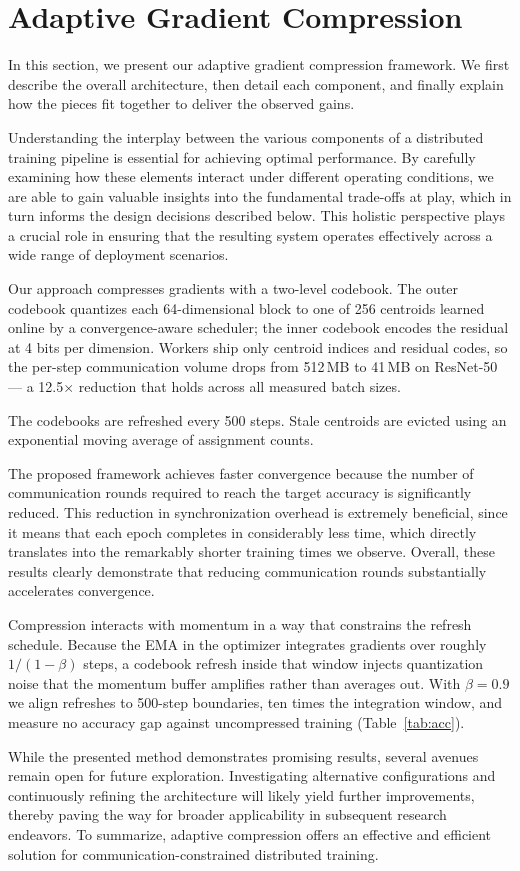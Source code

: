 \section{Adaptive Gradient Compression}\label{sec:method}

In this section, we present our adaptive gradient compression framework. We
first describe the overall architecture, then detail each component, and
finally explain how the pieces fit together to deliver the observed gains.

Understanding the interplay between the various components of a distributed
training pipeline is essential for achieving optimal performance. By carefully
examining how these elements interact under different operating conditions, we
are able to gain valuable insights into the fundamental trade-offs at play,
which in turn informs the design decisions described below. This holistic
perspective plays a crucial role in ensuring that the resulting system operates
effectively across a wide range of deployment scenarios.

Our approach compresses gradients with a two-level codebook. The outer codebook
quantizes each 64-dimensional block to one of 256 centroids learned online by a
convergence-aware scheduler; the inner codebook encodes the residual at 4 bits
per dimension. Workers ship only centroid indices and residual codes, so the
per-step communication volume drops from 512\,MB to 41\,MB on ResNet-50 ---
a 12.5$\times$ reduction that holds across all measured batch sizes.

The codebooks are refreshed every 500 steps. Stale centroids are evicted using
an exponential moving average of assignment counts.

The proposed framework achieves faster convergence because the number of
communication rounds required to reach the target accuracy is significantly
reduced. This reduction in synchronization overhead is extremely beneficial,
since it means that each epoch completes in considerably less time, which
directly translates into the remarkably shorter training times we observe.
Overall, these results clearly demonstrate that reducing communication rounds
substantially accelerates convergence.

Compression interacts with momentum in a way that constrains the refresh
schedule. Because the EMA in the optimizer integrates gradients over roughly
$1/(1-\beta)$ steps, a codebook refresh inside that window injects quantization
noise that the momentum buffer amplifies rather than averages out. With
$\beta=0.9$ we align refreshes to 500-step boundaries, ten times the
integration window, and measure no accuracy gap against uncompressed
training (Table~\ref{tab:acc}).

While the presented method demonstrates promising results, several avenues
remain open for future exploration. Investigating alternative configurations
and continuously refining the architecture will likely yield further
improvements, thereby paving the way for broader applicability in subsequent
research endeavors. To summarize, adaptive compression offers an effective and
efficient solution for communication-constrained distributed training.
